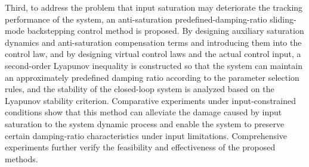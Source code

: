 \begin{eabstract}
Third, to address the problem that input saturation may deteriorate the tracking performance of the system, an anti-saturation predefined-damping-ratio sliding-mode backstepping control method is proposed. By designing auxiliary saturation dynamics and anti-saturation compensation terms and introducing them into the control law, and by designing virtual control laws and the actual control input, a second-order Lyapunov inequality is constructed so that the system can maintain an approximately predefined damping ratio according to the parameter selection rules, and the stability of the closed-loop system is analyzed based on the Lyapunov stability criterion. Comparative experiments under input-constrained conditions show that this method can alleviate the damage caused by input saturation to the system dynamic process and enable the system to preserve certain damping-ratio characteristics under input limitations. Comprehensive experiments further verify the feasibility and effectiveness of the proposed methods.
\end{eabstract}
